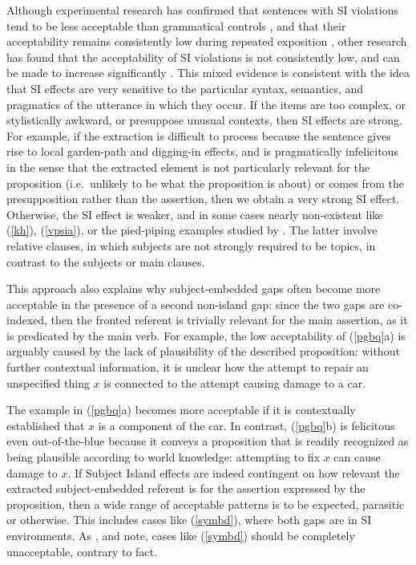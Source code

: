 \documentclass[output=paper
                ,modfonts
                ,nonflat
	        ,collection
	        ,collectionchapter
	        ,collectiontoclongg
 	        ,biblatex
                ,babelshorthands
                ,newtxmath
                ,draftmode
                ,colorlinks, citecolor=brown
]{./langsci/langscibook}
\begin{document}
Although experimental research has confirmed that sentences with SI violations tend to be less acceptable than grammatical controls \citep{sprsat2,goodall11,crawfordwccfl,clausencuny,greco}, and that their acceptability
remains consistently low during repeated exposition  \citep{sprsat2,crawfordwccfl}, other research has found that the acceptability of  SI violations is not consistently low, and can be made to increase significantly \citep{hiramatsu00,clausencuny,chavesjeruen,chavessubjexp}. This mixed evidence is consistent with the idea that SI effects are very sensitive to the particular syntax, semantics, and pragmatics of the utterance in which they occur. If the items are too complex, or stylistically awkward, or presuppose unusual contexts, then  
SI effects are  strong.  For example, if the extraction is difficult to process because the sentence gives rise to local  garden-path and digging-in effects, and is pragmatically infelicitous in the sense that the extracted element is not particularly relevant for the proposition (i.e.\ unlikely to be what the proposition is about) or comes from the presupposition rather than the assertion, then we obtain a very strong SI effect. Otherwise, the SI effect is weaker, and in some cases nearly non-existent like (\ref{kh}), (\ref{vpsia}), or 
 the  pied-piping examples studied by \citet{annerels}. The latter involve relative clauses, in which subjects are not strongly required to be topics, in contrast to the subjects or main clauses.

This approach also explains why subject-embedded gaps often become more acceptable in the presence of a second non-island gap: since the two gaps are co-indexed, then the fronted referent is trivially relevant for the main assertion, as it is predicated by the main verb. For example, the low acceptability of (\ref{pgbq}a) is arguably caused  by the lack of   plausibility of the described proposition: without further contextual information, it is unclear how the attempt to repair  an unspecified thing $x$ is connected to the attempt causing  damage to a car. 


\eal   \label{pgbq}
\zl


\noindent
The example in  (\ref{pgbq}a)  becomes more acceptable if it is contextually  established that $x$ is  a component of the car. In contrast, (\ref{pgbq}b) is felicitous even out-of-the-blue because it  conveys a  proposition  that is  readily recognized as being plausible according to world knowledge: attempting to fix $x$ can cause  damage to $x$.  If Subject Island effects are indeed contingent on how relevant the extracted subject-embedded referent is for the assertion expressed by the proposition, then a wide range of acceptable  patterns is to be expected, parasitic or otherwise. This includes cases like  (\ref{symbd}), where both gaps are in SI environments. As \citet{Levine:Sag:03}, \citet[256]{levhubook}  and \citet[161]{Culicover13} note, cases like (\ref{symbd}) should be completely unacceptable, contrary to fact.
\end{document}
